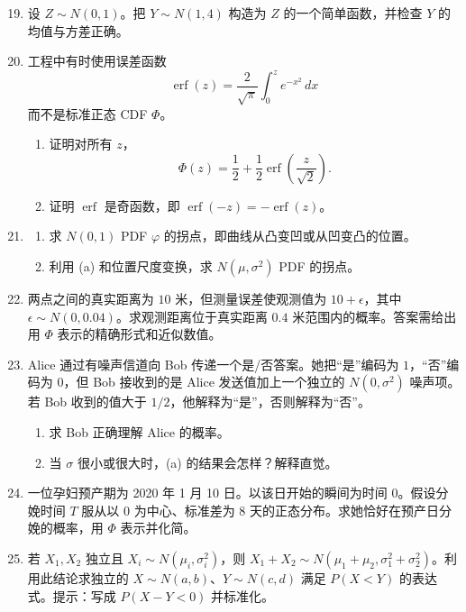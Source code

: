 \documentclass[UTF8,12pt,a4paper,fontset=fandol]{ctexart}
\begin{document}
\begin{enumerate}
  \setcounter{enumi}{18}
  \item 设 $Z\sim N(0,1)$。把 $Y\sim N(1,4)$ 构造为 $Z$ 的一个简单函数，并检查 $Y$ 的均值与方差正确。

  \item 工程中有时使用误差函数
  \[
    \operatorname{erf}(z)=\frac{2}{\sqrt{\pi}}\int_0^z e^{-x^2}\,dx
  \]
  而不是标准正态 CDF $\Phi$。
  \begin{enumerate}
    \item 证明对所有 $z$，
    \[
      \Phi(z)=\frac12+\frac12\operatorname{erf}\left(\frac{z}{\sqrt2}\right).
    \]
    \item 证明 $\operatorname{erf}$ 是奇函数，即 $\operatorname{erf}(-z)=-\operatorname{erf}(z)$。
  \end{enumerate}

  \item 
  \begin{enumerate}
    \item 求 $N(0,1)$ PDF $\varphi$ 的拐点，即曲线从凸变凹或从凹变凸的位置。
    \item 利用 (a) 和位置尺度变换，求 $N(\mu,\sigma^2)$ PDF 的拐点。
  \end{enumerate}

  \item 两点之间的真实距离为 $10$ 米，但测量误差使观测值为 $10+\epsilon$，其中 $\epsilon\sim N(0,0.04)$。求观测距离位于真实距离 $0.4$ 米范围内的概率。答案需给出用 $\Phi$ 表示的精确形式和近似数值。

  \item Alice 通过有噪声信道向 Bob 传递一个是/否答案。她把“是”编码为 $1$，“否”编码为 $0$，但 Bob 接收到的是 Alice 发送值加上一个独立的 $N(0,\sigma^2)$ 噪声项。若 Bob 收到的值大于 $1/2$，他解释为“是”，否则解释为“否”。
  \begin{enumerate}
    \item 求 Bob 正确理解 Alice 的概率。
    \item 当 $\sigma$ 很小或很大时，(a) 的结果会怎样？解释直觉。
  \end{enumerate}

  \item 一位孕妇预产期为 2020 年 1 月 10 日。以该日开始的瞬间为时间 $0$。假设分娩时间 $T$ 服从以 $0$ 为中心、标准差为 $8$ 天的正态分布。求她恰好在预产日分娩的概率，用 $\Phi$ 表示并化简。

  \item 若 $X_1,X_2$ 独立且 $X_i\sim N(\mu_i,\sigma_i^2)$，则 $X_1+X_2\sim N(\mu_1+\mu_2,\sigma_1^2+\sigma_2^2)$。利用此结论求独立的 $X\sim N(a,b)$、$Y\sim N(c,d)$ 满足 $P(X<Y)$ 的表达式。提示：写成 $P(X-Y<0)$ 并标准化。


\end{enumerate}
\end{document}

